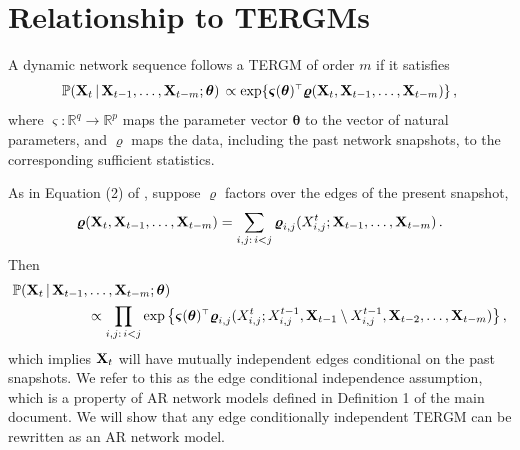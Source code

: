 \documentclass[12pt]{article}
\newcommand{\bvarsigma}{\boldsymbol \varsigma}
\newcommand{\bvarrho}{\boldsymbol \varrho}
\newcommand{\btheta}{\boldsymbol \theta}
\def\T{{\scriptscriptstyle \top} }
\newcommand{\0}{{\bf 0}}
\begin{document}
\section{Relationship to TERGMs}
\label{app:relation2ERGM}

A dynamic network sequence follows a TERGM of order $m$ if it satisfies
\begin{equation}\label{eq:tergmdef}
  \mathbb{P}({\bf X}_t \,|\, {\bf X}_{t-1}, \ldots, {\bf X}_{t-m} ; \btheta)\, \propto \exp\{ \bvarsigma(\btheta)^{\T} \bvarrho({\bf X}_t, {\bf X}_{t-1}, \ldots, {\bf X}_{t-m})\}\,,
\end{equation}
where $\bvarsigma: \mathbb{R}^q \rightarrow \mathbb{R}^p$ maps the parameter vector $\btheta$ to the vector of natural parameters, and $\bvarrho$ maps the data, including the past network snapshots, to the corresponding sufficient statistics.

As in Equation (2) of \cite{Hanneke2010_supp}, 
suppose $\bvarrho$ factors over the edges of the present snapshot,
\begin{equation*}
  \bvarrho({\bf X}_t, {\bf X}_{t-1}, \ldots, {\bf X}_{t-m}) = \sum_{i,j:\,i < j} \bvarrho_{i,j}(X^t_{i,j} ; {\bf X}_{t-1}, \ldots, {\bf X}_{t-m})\,.
\end{equation*}
Then 
\begin{align}
  &\mathbb{P}({\bf X}_t \,|\, {\bf X}_{t-1}, \ldots, {\bf X}_{t-m} ; \btheta) \notag\\
  &~~~~~~~~~~~~~~~~\propto \prod_{i,j:\,i < j} \exp \big\{ \bvarsigma(\btheta)^{\T} \bvarrho_{i,j}(X^t_{i,j} ; X_{i,j}^{t-1} , {\bf X}_{t-1} \setminus X_{i,j}^{t-1}, {\bf X}_{t-2}, \ldots, {\bf X}_{t-m} )\big\}\,,\label{eq:TERGM}
\end{align}
which implies ${\bf X}_t$ will have mutually independent edges conditional on the past snapshots. We refer to this as the edge conditional independence assumption, which is a property of AR network models defined in Definition 1 of the main document.
We will show that any edge conditionally independent TERGM can be rewritten as an AR network model.


\end{document}
